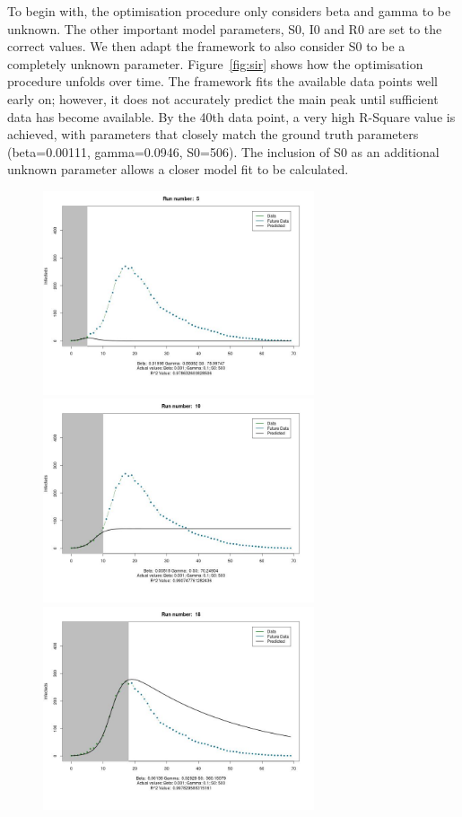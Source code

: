 To begin with, the optimisation procedure only considers beta and
gamma to be unknown. The other important model parameters, S0, I0 and
R0 are set to the correct values. We then adapt the framework to also
consider S0 to be a completely unknown parameter. Figure~\ref{fig:sir} shows how the optimisation
procedure unfolds over time. The framework fits the available data
points well early on; however, it does not accurately predict the main
peak until sufficient data has become available. By the 40th data
point, a very high R-Square value is achieved, with parameters that
closely match the ground truth parameters (beta=0.00111, gamma=0.0946,
S0=506). The inclusion of S0 as an additional unknown parameter allows
a closer model fit to be calculated.

\begin{centering}
\begin{figure}[h!]
  \includegraphics[width=8cm]{images/sirs0_5.jpeg}
  \includegraphics[width=8cm]{images/sirs0_10.jpeg}
  \includegraphics[width=8cm]{images/sirs0_18.jpeg}

\end{figure}
\end{centering}
